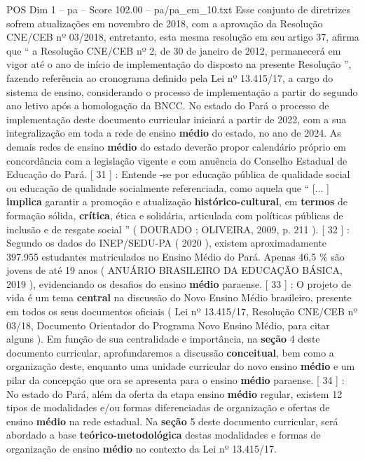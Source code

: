 \begin{textsample}{POS Dim 1 – pa – Score 102.00 – pa/pa\_em\_10.txt}
Esse conjunto de diretrizes sofrem atualizações em novembro de 2018, com a aprovação da Resolução CNE/CEB nº 03/2018, entretanto, esta mesma resolução em seu artigo 37, afirma que “ a Resolução CNE/CEB nº 2, de 30 de janeiro de 2012, permanecerá em vigor até o ano de início de implementação do disposto na presente Resolução ”, fazendo referência ao cronograma definido pela Lei nº 13.415/17, a cargo do sistema de ensino, considerando o processo de implementação a partir do segundo ano letivo após a homologação da BNCC.
No estado do Pará o processo de implementação deste documento curricular iniciará a partir de 2022, com a sua integralização em toda a rede de ensino \textbf{médio} do estado, no ano de 2024.
As demais redes de ensino \textbf{médio} do estado deverão propor calendário próprio em concordância com a legislação vigente e com anuência do Conselho Estadual de Educação do Pará. [ 31 ] : Entende -se por educação pública de qualidade social ou educação de qualidade socialmente referenciada, como aquela que “ [... ] \textbf{implica} garantir a promoção e atualização \textbf{histórico-cultural}, em \textbf{termos} de formação sólida, \textbf{crítica}, ética e solidária, articulada com políticas públicas de inclusão e de resgate social ” ( DOURADO ; OLIVEIRA, 2009, p. 211 ). [ 32 ] : Segundo os dados do INEP/SEDU-PA ( 2020 ), existem aproximadamente 397.955 estudantes matriculados no Ensino Médio do Pará.
Apenas 46,5 \% são jovens de até 19 anos ( ANUÁRIO BRASILEIRO DA EDUCAÇÃO BÁSICA, 2019 ), evidenciando os desafios do ensino \textbf{médio} paraense. [ 33 ] : O projeto de vida é um tema \textbf{central} na discussão do Novo Ensino Médio brasileiro, presente em todos os seus documentos oficiais ( Lei nº 13.415/17, Resolução CNE/CEB nº 03/18, Documento Orientador do Programa Novo Ensino Médio, para citar alguns ).
Em função de sua centralidade e importância, na \textbf{seção} 4 deste documento curricular, aprofundaremos a discussão \textbf{conceitual}, bem como a organização deste, enquanto uma unidade curricular do novo ensino \textbf{médio} e um pilar da concepção que ora se apresenta para o ensino \textbf{médio} paraense. [ 34 ] : No estado do Pará, além da oferta da etapa ensino \textbf{médio} regular, existem 12 tipos de modalidades e/ou formas diferenciadas de organização e ofertas de ensino \textbf{médio} na rede estadual.
Na \textbf{seção} 5 deste documento curricular, será abordado a base \textbf{teórico-metodológica} destas modalidades e formas de organização de ensino \textbf{médio} no contexto da Lei nº 13.415/17.


\end{textsample}
